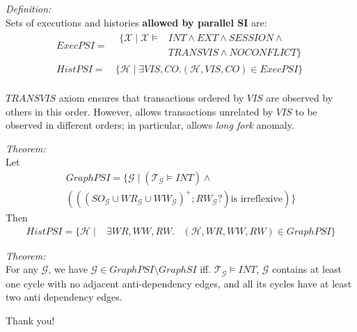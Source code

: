 \documentclass{beamer}
\begin{document}
\begin{frame}
	\textit{Definition:}\\
	Sets of executions and histories \textbf{allowed by parallel SI} are:
	$$
	\begin{aligned}
	ExecPSI = {} &
	\begin{aligned}
		\{
			\mathcal{X} \mid
			\mathcal{X} \vDash & INT \wedge EXT \wedge SESSION \wedge \\
			& TRANSVIS \wedge NOCONFLICT
		\}
	\end{aligned}
	\\
	HistPSI = {} & \{ \mathcal{H} \mid \exists VIS, CO. (\mathcal{H}, VIS, CO) \in ExecPSI \}
	\end{aligned}
	$$ \\
	$TRANSVIS$ axiom ensures that transactions ordered by $VIS$ are observed by others in this order. However, allows transactions unrelated by $VIS$ to be observed in different orders; in particular, allows \textit{long fork } anomaly.
\end{frame}

\begin{frame}
	\textit{Theorem:} \\
	Let
	\begin{multline*}
		GraphPSI = \{ \mathcal{G} \mid \left( \mathcal{T}_\mathcal{G} \vDash INT \right) \wedge \\
		\left(
			\left(
				\left(
					SO_\mathcal{G} \cup WR_\mathcal{G} \cup WW_\mathcal{G}
				\right)^+; RW_\mathcal{G}?
			\right) \text{is irreflexive}
		\right)
		\}
	\end{multline*}
	Then
	$$
		\begin{aligned}
			HistPSI = \{ \mathcal{H} \mid & \exists WR,WW,RW.
			& (\mathcal{H}, WR, WW, RW) \in GraphPSI \}	
		\end{aligned}
	$$
\end{frame}

\begin{frame}
	\textit{Theorem:} \\
	For any $\mathcal{G}$, we have $\mathcal{G} \in GraphPSI \setminus GraphSI $ iff. $\mathcal{T}_\mathcal{G} \vDash INT$, $\mathcal{G}$ contains at least one cycle with no adjacent anti-dependency edges, and all its cycles have at least two anti dependency edges.
\end{frame}


\begin{frame}
	\begin{center}
		Thank you!
	\end{center}
\end{frame}
\end{document}
